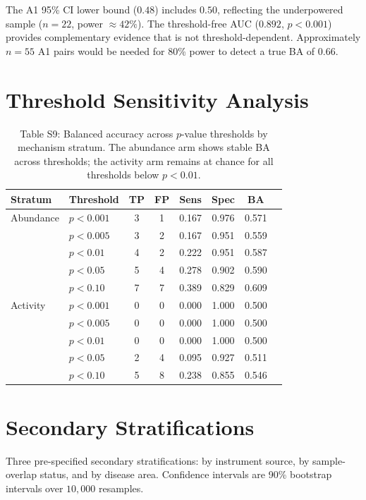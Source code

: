 \documentclass[11pt]{article}
\begin{document}
The A1 95\% CI lower bound ($0.48$) includes $0.50$, reflecting the underpowered sample ($n = 22$, power $\approx 42\%$). The threshold-free AUC ($0.892$, $p < 0.001$) provides complementary evidence that is not threshold-dependent. Approximately $n = 55$ A1 pairs would be needed for 80\% power to detect a true BA of $0.66$.

\clearpage

\section{Threshold Sensitivity Analysis}
\label{supp:threshold}

\begin{table}[H]
\centering
\caption{Table S9: Balanced accuracy across $p$-value thresholds by mechanism stratum. The abundance arm shows stable BA across thresholds; the activity arm remains at chance for all thresholds below $p < 0.01$.}
\small
\begin{tabular}{llcccccc}
\toprule
Stratum & Threshold & TP & FP & Sens & Spec & BA \\
\midrule
Abundance & $p < 0.001$ & 3 & 1 & 0.167 & 0.976 & 0.571 \\
& $p < 0.005$ & 3 & 2 & 0.167 & 0.951 & 0.559 \\
& $p < 0.01$ & 4 & 2 & 0.222 & 0.951 & 0.587 \\
& $p < 0.05$ & 5 & 4 & 0.278 & 0.902 & 0.590 \\
& $p < 0.10$ & 7 & 7 & 0.389 & 0.829 & 0.609 \\
\midrule
Activity & $p < 0.001$ & 0 & 0 & 0.000 & 1.000 & 0.500 \\
& $p < 0.005$ & 0 & 0 & 0.000 & 1.000 & 0.500 \\
& $p < 0.01$ & 0 & 0 & 0.000 & 1.000 & 0.500 \\
& $p < 0.05$ & 2 & 4 & 0.095 & 0.927 & 0.511 \\
& $p < 0.10$ & 5 & 8 & 0.238 & 0.855 & 0.546 \\
\bottomrule
\end{tabular}
\end{table}

\clearpage

\section{Secondary Stratifications}
\label{supp:strat}

Three pre-specified secondary stratifications: by instrument source, by sample-overlap status, and by disease area. Confidence intervals are 90\% bootstrap intervals over $10{,}000$ resamples.
\end{document}
